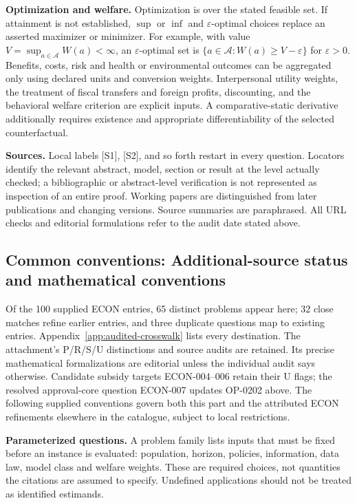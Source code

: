 \documentclass[11pt,a4paper]{article}
\begin{document}
\textbf{Optimization and welfare.} Optimization is over the stated feasible set. If attainment is not established, $\sup$ or $\inf$ and $\varepsilon$-optimal choices replace an asserted maximizer or minimizer. For example, with value $V=\sup_{a\in\mathcal A}W(a)<\infty$, an $\varepsilon$-optimal set is $\{a\in\mathcal A:W(a)\geq V-\varepsilon\}$ for $\varepsilon>0$. Benefits, costs, risk and health or environmental outcomes can be aggregated only using declared units and conversion weights. Interpersonal utility weights, the treatment of fiscal transfers and foreign profits, discounting, and the behavioral welfare criterion are explicit inputs. A comparative-static derivative additionally requires existence and appropriate differentiability of the selected counterfactual.

\textbf{Sources.} Local labels [S1], [S2], and so forth restart in every question. Locators identify the relevant abstract, model, section or result at the level actually checked; a bibliographic or abstract-level verification is not represented as inspection of an entire proof. Working papers are distinguished from later publications and changing versions. Source summaries are paraphrased. All URL checks and editorial formulations refer to the audit date stated above.

\subsection*{Common conventions: Additional-source status and mathematical conventions}

\label{audited:conventions}

Of the 100 supplied ECON entries, 65 distinct problems appear here; 32 close
matches refine earlier entries, and three duplicate questions map to existing
entries. Appendix~\ref{app:audited-crosswalk} lists every destination.
The attachment's P/R/S/U distinctions and source audits are retained. Its
precise mathematical formalizations are editorial unless the individual audit
says otherwise. Candidate subsidy targets ECON-004--006 retain their U flags;
the resolved approval-core question ECON-007 updates OP-0202 above.
The following supplied conventions govern both this part and the attributed
ECON refinements elsewhere in the catalogue, subject to local restrictions.

\textbf{Parameterized questions.} A problem family lists inputs that must be fixed before an instance is evaluated: population, horizon, policies, information, data law, model class and welfare weights. These are required choices, not quantities the citations are assumed to specify. Undefined applications should not be treated as identified estimands.
\end{document}
